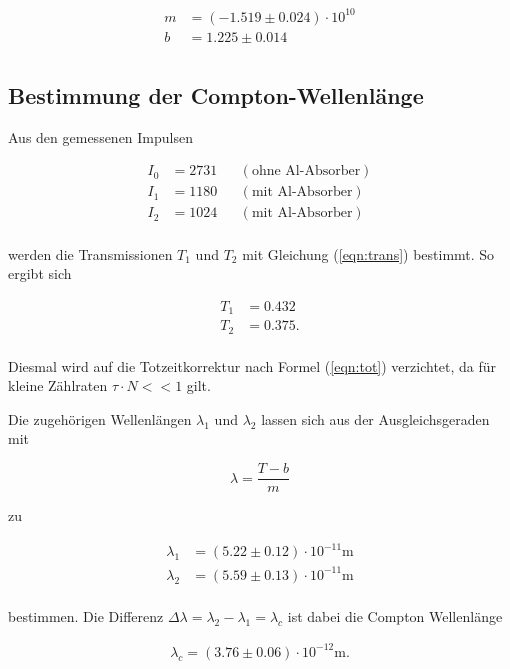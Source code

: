 \begin{align*}
    m &= (-1.519 \pm 0.024)\cdot 10^{10} \\
    b &= 1.225 \pm 0.014 \\
\end{align*}

\subsection{Bestimmung der Compton-Wellenlänge}
Aus den gemessenen Impulsen 

\begin{align*}
    I_0 &= 2731 & &(\text{ohne Al-Absorber})\\
    I_1 &= 1180 & &(\text{mit Al-Absorber})\\
    I_2 &= 1024 & &(\text{mit Al-Absorber})\\  
\end{align*}

\noindent
werden die Transmissionen $T_1$ und $T_2$ mit Gleichung (\ref{eqn:trans}) bestimmt. So ergibt sich

\begin{align*}
    T_1 &= 0.432 \\
    T_2 &= 0.375.\\
\end{align*}

\noindent
Diesmal wird auf die Totzeitkorrektur nach Formel (\ref{eqn:tot}) verzichtet, da für kleine Zählraten $\tau \cdot N << 1$ gilt.

\noindent
Die zugehörigen Wellenlängen $\lambda_1$ und $\lambda_2$ lassen sich aus der Ausgleichsgeraden
mit 

\begin{equation*}
    \lambda = \frac{T - b}{m}
\end{equation*}

\noindent
zu

\begin{align*}
    \lambda_1 &= (5.22\pm 0.12)\cdot 10^{-11} \si{\meter}\\
    \lambda_2 &= (5.59\pm 0.13)\cdot 10^{-11} \si{\meter}\\
\end{align*}

\noindent
bestimmen.
Die Differenz $\Delta \lambda = \lambda_2 - \lambda_1 = \lambda_c$ ist dabei die Compton Wellenlänge

\begin{align*}
    \lambda_c =(3.76\pm 0.06)\cdot 10^{-12} \si{\meter}.
\end{align*}

